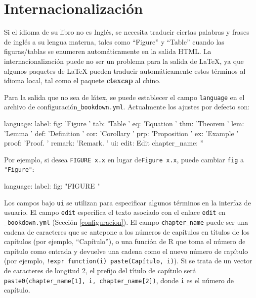 \documentclass[12pt,]{krantz}
\makeatletter
\newenvironment{Shaded}{\begin{snugshade}}{\end{snugshade}}
\newcommand{\StringTok}[1]{\textcolor[rgb]{0.31,0.60,0.02}{{#1}}}
\newcommand{\FunctionTok}[1]{\textcolor[rgb]{0.00,0.00,0.00}{{#1}}}
\newcommand{\NormalTok}[1]{{#1}}
\newenvironment{kframe}{%
\medskip{}
\setlength{\fboxsep}{.8em}
 \def\at@end@of@kframe{}%
 \ifinner\ifhmode%
  \def\at@end@of@kframe{\end{minipage}}%
  \begin{minipage}{\columnwidth}%
 \fi\fi%
 \def\FrameCommand##1{\hskip\@totalleftmargin \hskip-\fboxsep
 \colorbox{shadecolor}{##1}\hskip-\fboxsep
     \hskip-\linewidth \hskip-\@totalleftmargin \hskip\columnwidth}%
 \MakeFramed {\advance\hsize-\width
   \@totalleftmargin\z@ \linewidth\hsize
   \@setminipage}}%
 {\par\unskip\endMakeFramed%
 \at@end@of@kframe}
\renewenvironment{Shaded}{\begin{kframe}}{\end{kframe}}
\theoremstyle{definition}
\theoremstyle{definition}
\theoremstyle{remark}
\makeatother
\begin{document}
\hypertarget{internacionalizacion}{\section{Internacionalización}\label{internacionalizacion}}

Si el idioma de su libro no es Inglés, se necesita traducir ciertas
palabras y frases de inglés a su lengua materna, tales como ``Figure'' y
``Table'' cuando las figuras/tablas se enumeren automáticamente en la
salida HTML. La internacionalización puede no ser un problema para la
salida de LaTeX, ya que algunos paquetes de LaTeX pueden traducir
automáticamente estos términos al idioma local, tal como el paquete
\textbf{ctexcap} al chino.

Para la salida que no sea de látex, se puede establecer el campo
\texttt{language} en el archivo de configuración\texttt{\_bookdown.yml}.
Actualmente los ajustes por defecto son:

\begin{Shaded}
\begin{Highlighting}[]
\FunctionTok{language:}
  \FunctionTok{label:}
    \FunctionTok{fig:} \StringTok{'Figure '}
    \FunctionTok{tab:} \StringTok{'Table '}
    \FunctionTok{eq:} \StringTok{'Equation '}
    \FunctionTok{thm:} \StringTok{'Theorem '}
    \FunctionTok{lem:} \StringTok{'Lemma '}
    \FunctionTok{def:} \StringTok{'Definition '}
    \FunctionTok{cor:} \StringTok{'Corollary '}
    \FunctionTok{prp:} \StringTok{'Proposition '}
    \FunctionTok{ex:} \StringTok{'Example '}
    \FunctionTok{proof:} \StringTok{'Proof. '}
    \FunctionTok{remark:} \StringTok{'Remark. '}
  \FunctionTok{ui:}
    \FunctionTok{edit:} \NormalTok{Edit}
    \FunctionTok{chapter_name:} \StringTok{''}
\end{Highlighting}
\end{Shaded}

Por ejemplo, si desea \texttt{FIGURE\ x.x} en lugar
de\texttt{Figure\ x.x}, puede cambiar \texttt{fig} a \texttt{"Figure"}:

\begin{Shaded}
\begin{Highlighting}[]
\FunctionTok{language:}
  \FunctionTok{label:}
    \FunctionTok{fig:} \StringTok{"FIGURE "}
\end{Highlighting}
\end{Shaded}

Los campos bajo \texttt{ui} se utilizan para especificar algunos
términos en la interfaz de usuario. El campo \texttt{edit} especifica el
texto asociado con el enlace \texttt{edit} en \texttt{\_bookdown.yml}
(Sección \ref{configuracion}). El campo \texttt{chapter\_name} puede ser
una cadena de caracteres que se antepone a los números de capítulos en
títulos de los capítulos (por ejemplo, ``Capítulo''), o una función de R
que toma el número de capítulo como entrada y devuelve una cadena como
el nuevo número de capítulo (por ejemplo,
\texttt{!expr\ function(i)\ paste(\textquotesingle{}Capítulo\textquotesingle{},\ i)}).
Si se trata de un vector de caracteres de longitud 2, el prefijo del
título de capítulo será
\texttt{paste0(chapter\_name{[}1{]},\ i,\ chapter\_name{[}2{]})}, donde
\texttt{i} es el número de capítulo.
\end{document}

